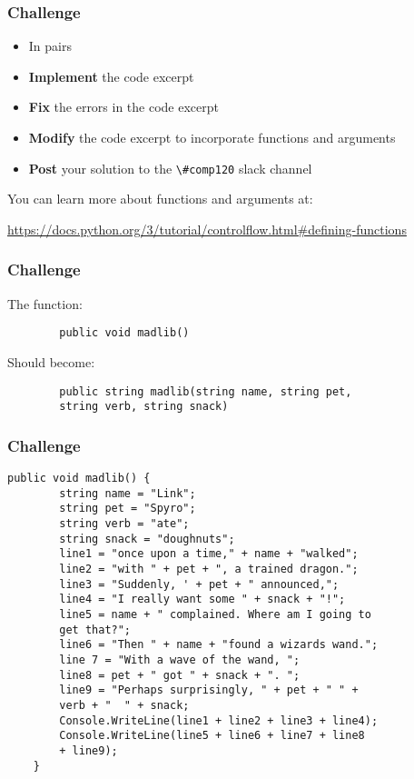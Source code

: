 \begin{frame}
	\frametitle{Challenge}
	
	\begin{itemize}
		\item In pairs
		\item \textbf{Implement} the code excerpt
		\item \textbf{Fix} the errors in the code excerpt
		\item \textbf{Modify} the code excerpt to incorporate functions and arguments
		\item \textbf{Post} your solution to the \lstinline{\#comp120} slack channel
	\end{itemize}
	
	You can learn more about functions and arguments at:
	
	\vspace{1em}
	
	 \url{https://docs.python.org/3/tutorial/controlflow.html\#defining-functions}
	
	\vspace{1em}
	
\end{frame}

\begin{frame}[fragile]
	\frametitle{Challenge}
		
	The function:

	\begin{lstlisting}
		public void madlib()
	\end{lstlisting}
	
	\vspace{1.5em}
	
	Should become:
	
	\begin{lstlisting}
		public string madlib(string name, string pet, 
		string verb, string snack)
	\end{lstlisting}
	
\end{frame}

\begin{frame}[fragile]
	\frametitle{Challenge}
	
	\begin{lstlisting}
public void madlib() {
		string name = "Link";
		string pet = "Spyro";
		string verb = "ate";
		string snack = "doughnuts";
		line1 = "once upon a time," + name + "walked";
		line2 = "with " + pet + ", a trained dragon.";
		line3 = "Suddenly, ' + pet + " announced,";
		line4 = "I really want some " + snack + "!";
		line5 = name + " complained. Where am I going to
		get that?";
		line6 = "Then " + name + "found a wizards wand.";
		line 7 = "With a wave of the wand, ";
		line8 = pet + " got " + snack + ". ";
		line9 = "Perhaps surprisingly, " + pet + " " + 
		verb + "  " + snack;
		Console.WriteLine(line1 + line2 + line3 + line4);
		Console.WriteLine(line5 + line6 + line7 + line8
		+ line9);
	}
\end{lstlisting}
	
\end{frame}